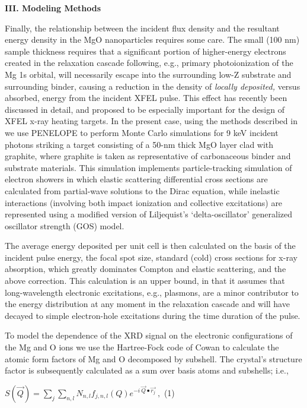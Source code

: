 \textbf{III. Modeling Methods}

Finally, the relationship between the incident flux density and the
resultant energy density in the MgO nanoparticles requires some care.
The small (100 nm) sample thickness requires that a significant portion
of higher-energy electrons created in the relaxation cascade following,
e.g., primary photoionization of the Mg 1s orbital, will necessarily
escape into the surrounding low-Z substrate and surrounding binder,
causing a reduction in the density of \emph{locally deposited,} versus
absorbed, energy from the incident XFEL pulse. This effect has recently
been discussed in detail, and proposed to be especially important for
the design of XFEL x-ray heating targets. \cite{HOIDN2017NONLOCAL} In the present case,
using the methods described in \cite{HOIDN2017NONLOCAL} we use PENELOPE to perform Monte
Carlo simulations for 9 keV incident photons striking a target
consisting of a 50-nm thick MgO layer clad with graphite, where graphite
is taken as representative of carbonaceous binder and substrate
materials. This simulation implements particle-tracking simulation of
electron showers in which elastic scattering differential cross sections
are calculated from partial-wave solutions to the Dirac equation, while
inelastic interactions (involving both impact ionization and collective
excitations) are represented using a modified version of Liljequist's
`delta-oscillator' generalized oscillator strength (GOS) model. \cite{HOIDN2017NONLOCAL}

The average energy deposited per unit cell is then calculated on the
basis of the incident pulse energy, the focal spot size, standard (cold)
cross sections for x-ray absorption, which greatly dominates Compton and
elastic scattering, and the above correction. This calculation is an
upper bound, in that it assumes that long-wavelength electronic
excitations, e.g., plasmons, are a minor contributor to the energy
distribution at any moment in the relaxation cascade and will have
decayed to simple electron-hole excitations during the time duration of
the pulse.

To model the dependence of the XRD signal on the electronic
configurations of the Mg and O ions we use the Hartree-Fock code of
Cowan \cite{ABDALLAH1988THEORETICAL} to calculate the atomic form factors of Mg and O
decomposed by subshell. The crystal's structure factor is subsequently
calculated as a sum over basis atoms and subshells; i.e.,

\(S\left( \overrightarrow{Q} \right) = \sum_{j}^{}{\sum_{n,l}N_{n,l}f_{j,n,l}\left( Q \right)e^{- i\ \overrightarrow{Q} \bullet \overrightarrow{r_{j}}}\ },\)
(1)

